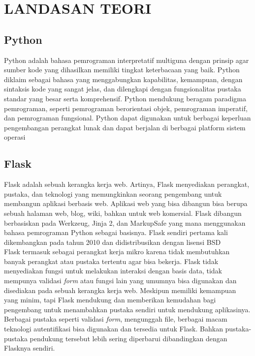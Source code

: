 \chapter{LANDASAN TEORI}

 \section{Python}
	 Python adalah bahasa pemrograman interpretatif multiguna dengan prinsip agar sumber kode yang dihasilkan memiliki tingkat keterbacaan yang baik. Python diklaim sebagai bahasa yang menggabungkan kapabilitas, kemampuan, dengan sintaksis kode yang sangat jelas, dan dilengkapi dengan fungsionalitas pustaka standar yang besar serta komprehensif. Python mendukung beragam paradigma pemrograman, seperti pemrograman berorientasi objek, pemrograman imperatif, dan pemrograman fungsional. Python dapat digunakan untuk berbagai keperluan pengembangan perangkat lunak dan dapat berjalan di berbagai platform sistem operasi \cite{bab2-python} \\

 \section{Flask}
	 Flask adalah sebuah kerangka kerja web. Artinya, Flask menyediakan perangkat, pustaka, dan teknologi yang memungkinkan seorang pengembang untuk membangun aplikasi berbasis web. Aplikasi web yang bisa dibangun bisa berupa sebuah halaman web, blog, wiki, bahkan untuk web komersial. Flask dibangun berbasiskan pada Werkzeug, Jinja 2, dan MarkupSafe yang mana menggunakan bahasa pemrograman Python sebagai basisnya. Flask sendiri pertama kali dikembangkan pada tahun 2010 dan didistribusikan dengan lisensi BSD \\
	 \indent Flask termasuk sebagai perangkat kerja mikro karena tidak membutuhkan banyak perangkat atau pustaka tertentu agar bisa bekerja. Flask tidak menyediakan fungsi untuk melakukan interaksi dengan basis data, tidak mempunya validasi \textit{form} atau fungsi lain yang umumnya bisa digunakan dan disediakan pada sebuah kerangka kerja web. Meskipun memiliki kemampuan yang minim, tapi Flask mendukung dan memberikan kemudahan bagi pengembang untuk menambahkan pustaka sendiri untuk mendukung aplikasinya. Berbagai pustaka seperti validasi \textit{form}, mengunggah file, berbagai macam teknologi autentifikasi bisa digunakan dan tersedia untuk Flask. Bahkan pustaka-pustaka pendukung tersebut lebih sering diperbarui dibandingkan dengan Flasknya sendiri.
	 
